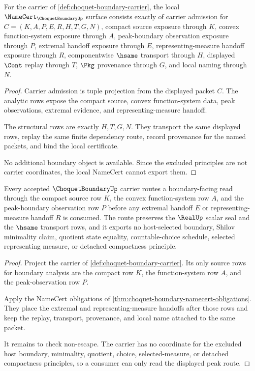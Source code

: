 \begin{theorem}
\label{thm:choquet-boundary-namecert-obligations}
For the carrier of \autoref{def:choquet-boundary-carrier}, the local $\NameCert_{\ChoquetBoundaryUp}$ surface consists exactly of carrier admission for $C=(K,A,P,E,R,H,T,G,N)$, compact source exposure through $K$, convex function-system exposure through $A$, peak-boundary observation exposure through $P$, extremal handoff exposure through $E$, representing-measure handoff exposure through $R$, componentwise $\hsame$ transport through $H$, displayed $\Cont$ replay through $T$, $\Pkg$ provenance through $G$, and local naming through $N$.
\end{theorem}
\begin{proof}
Carrier admission is tuple projection from the displayed packet $C$. The analytic rows expose the compact source, convex function-system data, peak observations, extremal evidence, and representing-measure handoff.

The structural rows are exactly $H,T,G,N$. They transport the same displayed rows, replay the same finite dependency route, record provenance for the named packets, and bind the local certificate.

No additional boundary object is available. Since the excluded principles are not carrier coordinates, the local NameCert cannot export them.
\end{proof}

\begin{theorem}
\label{thm:choquet-boundary-peak-route}
Every accepted $\ChoquetBoundaryUp$ carrier routes a boundary-facing read through the compact source row $K$, the convex function-system row $A$, and the peak-boundary observation row $P$ before any extremal handoff $E$ or representing-measure handoff $R$ is consumed. The route preserves the $\RealUp$ scalar seal and the $\hsame$ transport rows, and it exports no host-selected boundary, Shilov minimality claim, quotient state equality, countable-choice schedule, selected representing measure, or detached compactness principle.
\end{theorem}
\begin{proof}
Project the carrier of \autoref{def:choquet-boundary-carrier}. Its only source rows for boundary analysis are the compact row $K$, the function-system row $A$, and the peak-observation row $P$.

Apply the NameCert obligations of \autoref{thm:choquet-boundary-namecert-obligations}. They place the extremal and representing-measure handoffs after those rows and keep the replay, transport, provenance, and local name attached to the same packet.

It remains to check non-escape. The carrier has no coordinate for the excluded host boundary, minimality, quotient, choice, selected-measure, or detached compactness principles, so a consumer can only read the displayed peak route.
\end{proof}

